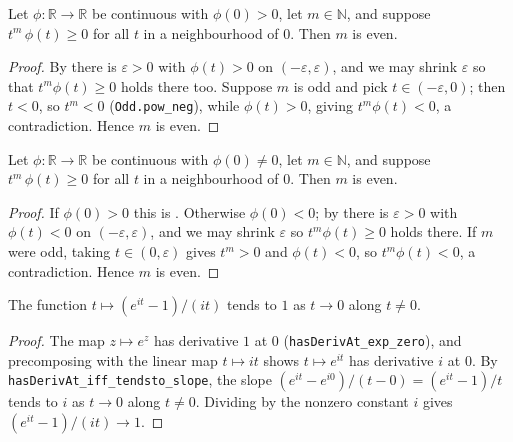 \begin{lemma}
    \label{lem:nonneg-even-order-pos}
    \leanok
    Let $\phi : \mathbb{R} \to \mathbb{R}$ be continuous with $\phi(0) > 0$, let
    $m \in \mathbb{N}$, and suppose $t^{m}\,\phi(t) \ge 0$ for all $t$ in a
    neighbourhood of $0$. Then $m$ is even.
\end{lemma}
\begin{proof}
    By  there is $\varepsilon > 0$ with $\phi(t) > 0$
    on $(-\varepsilon, \varepsilon)$, and we may shrink $\varepsilon$ so that
    $t^{m}\phi(t) \ge 0$ holds there too. Suppose $m$ is odd and pick
    $t \in (-\varepsilon, 0)$; then $t < 0$, so $t^{m} < 0$
    (\texttt{Odd.pow\_neg}), while $\phi(t) > 0$, giving $t^{m}\phi(t) < 0$, a
    contradiction. Hence $m$ is even.
\end{proof}

\begin{lemma}
    \label{lem:nonneg-even-order}
    \leanok
    Let $\phi : \mathbb{R} \to \mathbb{R}$ be continuous with $\phi(0) \neq 0$,
    let $m \in \mathbb{N}$, and suppose $t^{m}\,\phi(t) \ge 0$ for all $t$ in a
    neighbourhood of $0$. Then $m$ is even.
\end{lemma}
\begin{proof}
    If $\phi(0) > 0$ this is . Otherwise
    $\phi(0) < 0$; by  there is $\varepsilon > 0$ with
    $\phi(t) < 0$ on $(-\varepsilon, \varepsilon)$, and we may shrink
    $\varepsilon$ so $t^{m}\phi(t) \ge 0$ holds there. If $m$ were odd, taking
    $t \in (0, \varepsilon)$ gives $t^{m} > 0$ and $\phi(t) < 0$, so
    $t^{m}\phi(t) < 0$, a contradiction. Hence $m$ is even.
\end{proof}

\begin{lemma}
    \label{lem:exp-slope-tendsto}
    The function $t \mapsto (e^{i t} - 1)/(i t)$ tends to $1$ as $t \to 0$ along
    $t \neq 0$.
\end{lemma}
\begin{proof}
    The map $z \mapsto e^{z}$ has derivative $1$ at $0$
    (\texttt{hasDerivAt\_exp\_zero}), and precomposing with the linear map
    $t \mapsto i t$ shows $t \mapsto e^{i t}$ has derivative $i$ at $0$. By
    \texttt{hasDerivAt\_iff\_tendsto\_slope}, the slope
    $(e^{i t} - e^{i 0})/(t - 0) = (e^{i t} - 1)/t$ tends to $i$ as $t \to 0$
    along $t \neq 0$. Dividing by the nonzero constant $i$ gives
    $(e^{i t} - 1)/(i t) \to 1$.
\end{proof}

